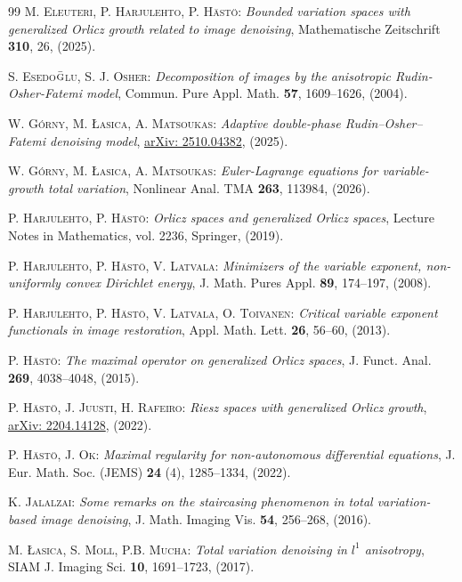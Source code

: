 \documentclass[a4paper,11pt,oneside,notitlepage]{article}
\numberwithin{equation}{section}
\begin{document}
\begin{thebibliography}{99}
 \textsc{M. Eleuteri, P. Harjulehto, P. H\"ast\"o:} \emph{Bounded variation spaces with generalized Orlicz growth related to image denoising}, Mathematische Zeitschrift {\bf 310}, 26, (2025).

 \textsc{S. Esedo$\bar{\textsc{g}}$lu, S. J. Osher:} \emph{Decomposition of images by the anisotropic Rudin-Osher-Fatemi model}, Commun. Pure Appl. Math. {\bf 57}, 1609--1626, (2004). 

 \textsc{W. Górny, M. Łasica, A. Matsoukas:} \emph{Adaptive double-phase Rudin–Osher–Fatemi denoising model}, \href{https://arxiv.org/abs/2510.04382}{arXiv: 2510.04382}, (2025).

 \textsc{W. Górny, M. Łasica, A. Matsoukas:} \emph{Euler-Lagrange equations for variable-growth total variation}, Nonlinear Anal. TMA {\bf 263}, 113984, (2026).



 \textsc{P. Harjulehto, P. H\"ast\"o:} \emph{Orlicz spaces and generalized Orlicz spaces}, Lecture Notes in Mathematics, vol. 2236, Springer, (2019).

 \textsc{P. Harjulehto, P. H\"ast\"o, V. Latvala:} \emph{Minimizers of the variable exponent, non-uniformly convex Dirichlet energy}, J. Math. Pures Appl. {\bf 89}, 174--197, (2008).

 \textsc{P. Harjulehto, P. H\"ast\"o, V. Latvala, O. Toivanen:} \emph{Critical variable exponent functionals in image restoration}, Appl. Math. Lett. {\bf 26}, 56--60, (2013).

 \textsc{P. H\"ast\"o:} \emph{The maximal operator on generalized Orlicz spaces}, J. Funct. Anal. {\bf 269}, 4038--4048, (2015).

 \textsc{P. H\"ast\"o, J. Juusti, H. Rafeiro:} \emph{Riesz spaces with generalized Orlicz growth}, \href{https://arxiv.org/abs/2204.14128}{arXiv: 2204.14128}, (2022).

 \textsc{P. H\"ast\"o, J. Ok:} \emph{Maximal regularity for non-autonomous differential equations}, J. Eur. Math. Soc. (JEMS) {\bf 24} (4), 1285--1334, (2022).

 \textsc{K. Jalalzai:} \emph{Some remarks on the staircasing phenomenon in total variation-based image denoising}, J. Math. Imaging Vis. {\bf 54}, 256--268, (2016).

 \textsc{M. Łasica, S. Moll, P.B. Mucha:} \emph{Total variation denoising in $l^1$ anisotropy}, SIAM J. Imaging Sci. {\bf 10}, 1691--1723, (2017).


\end{thebibliography}
\end{document}
